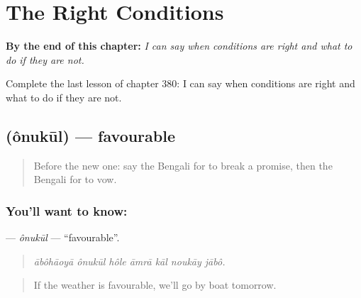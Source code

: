
\chapter{The Right Conditions}
\label{ch:bn-the-right-conditions}

\begin{chapteropening}
\textbf{By the end of this chapter:} \emph{I can say when conditions are right and what to do if they are not.}

Complete the last lesson of chapter 380: I can say when conditions are right and what to do if they are not.
\end{chapteropening}

\section[\texorpdfstring{\bn{অনুকূল} (ônukūl)}{অনুকূল (ônukūl)}]{ (ônukūl) — favourable}

\label{lesson:BN-C380-onukul}



\begin{quote}
Before the new one: say the Bengali for to break a promise, then the Bengali for to vow.
\end{quote}

\subsection*{You'll want to know: }
\textbf{} — \emph{ônukūl} — \textquotedblleft{}favourable\textquotedblright{}.

\begin{quote}
      
\end{quote}

\begin{quote}
\emph{ābôhāoyā ônukūl hôle āmrā kāl noukāy jābô.}
\end{quote}

\begin{quote}
If the weather is favourable, we'll go by boat tomorrow.
\end{quote}

